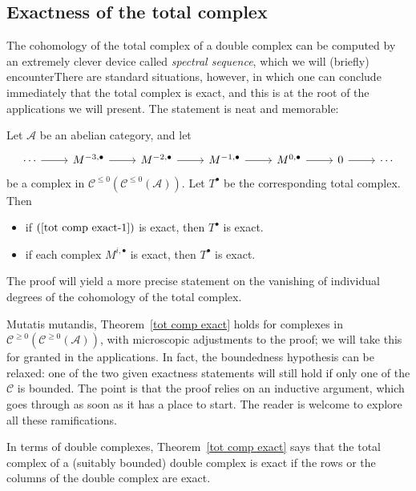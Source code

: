 \subsection{Exactness of the total complex}
The cohomology of the total complex of a double complex can be computed by an extremely clever device called \textit{spectral sequence}, which we will (briefly) encounterThere are standard situations, however, in which one can conclude immediately that the total complex is exact, and this is at the root of the applications we will present. The statement is neat
and memorable:
\begin{theorem}\label{tot comp exact}
Let $\mathcal{A}$ be an abelian category, and let
\begin{equation}\label{tot comp exact-1}
\begin{tikzcd}
\cdots\ar[r]&M^{-3,\bullet}\ar[r]&M^{-2,\bullet}\ar[r]&M^{-1,\bullet}\ar[r]&M^{0,\bullet}\ar[r]&0\ar[r]&\cdots
\end{tikzcd}
\end{equation}
be a complex in $\mathcal{C}^{\leq0}(\mathcal{C}^{\leq0}(\mathcal{A}))$. Let $T^\bullet$ be the corresponding total complex. Then
\begin{itemize}
\item if $(\ref{tot comp exact-1})$ is exact, then $T^\bullet$ is exact.
\item if each complex $M^{i,\bullet}$ is exact, then $T^\bullet$ is exact.
\end{itemize}
\end{theorem}
The proof will yield a more precise statement on the vanishing of individual degrees of the cohomology of the total complex.\par
Mutatis mutandis, Theorem~\ref{tot comp exact} holds for complexes in $\mathcal{C}^{\geq0}(\mathcal{C}^{\geq0}(\mathcal{A}))$, with microscopic
adjustments to the proof; we will take this for granted in the applications. In fact, the boundedness hypothesis can be relaxed: one of the two given exactness statements will still hold if only one of the $\mathcal{C}$ is bounded. The point is that the proof relies on an inductive argument, which goes through as soon as it has a place to start. The reader is welcome to explore all these ramifications.\par
In terms of double complexes, Theorem~\ref{tot comp exact} says that the total complex of a (suitably bounded) double complex is exact if the rows or the columns of the double complex are exact.
